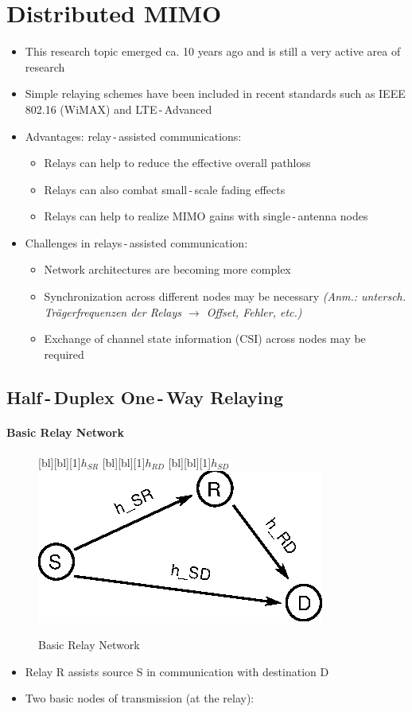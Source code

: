 \documentclass[a4paper, 10pt]{article}
\begin{document}
\section{Distributed MIMO}

\begin{itemize}
	\item This research topic emerged ca. 10 years ago and is still a very active area of research
	\item Simple relaying schemes have been included in recent standards such as IEEE 802.16 (WiMAX) and LTE\,-\,Advanced
	\item Advantages: relay\,-\,assisted communications:
	\begin{itemize}
		\item Relays can help to reduce the effective overall pathloss
		\item Relays can also combat small\,-\,scale fading effects
		\item Relays can help to realize MIMO gains with single\,-\,antenna nodes
	\end{itemize}
	\item Challenges in relays\,-\,assisted communication:
	\begin{itemize}
		\item Network architectures are becoming more complex
		\item Synchronization across different nodes may be necessary \textit{(Anm.: untersch. Tr\"agerfrequenzen der Relays $\rightarrow $ Offset, Fehler, etc.)}
		\item Exchange of channel state information (CSI) across nodes may be required
	\end{itemize}
\end{itemize}

\subsection{Half\,-\,Duplex One\,-\,Way Relaying}
\paragraph{Basic Relay Network}
\begin{figure}[ht]
	\centering
	[bl][bl][1]{$h_{SR}$}
	[bl][bl][1]{$h_{RD}$}
	[bl][bl][1]{$h_{SD}$}
	\includegraphics[scale=2]{Basic_Relay_Network}	
	\caption{Basic Relay Network}
	\label{fig:basic_relay_network}
\end{figure}
\begin{itemize}
	\item Relay R assists source S in communication with destination D
	\item Two basic nodes of transmission (at the relay):
\end{itemize}
\end{document}
